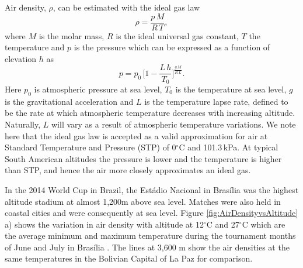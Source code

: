 \documentclass[a4paper]{article}
\begin{document}
Air density, $\rho$, can be estimated with the ideal gas law~\cite{IdealGasLaw}
%
\begin{equation}
\rho = \frac{p\,M}{R\,T},
\end{equation}
%
where $M$ is the molar mass, $R$ is the ideal universal gas constant, $T$ the temperature and $p$ is the pressure which can be expressed as a function of elevation $h$ as
%
\begin{equation}
p = p_{0}\,\Bigg[1 - \frac{L\,h}{T_{0}}\Bigg]^{\frac{g\,M}{R\,L}}.
\end{equation}
%
Here $p_{0}$ is atmospheric pressure at sea level, $T_{0}$ is the temperature at sea level, $g$ is the gravitational acceleration and $L$ is the temperature lapse rate, defined to be the rate at which atmospheric temperature decreases with increasing altitude.  Naturally, $L$ will vary as a result of atmospheric temperature variations.  We note here that the ideal gas law is accepted as a valid approximation for air at Standard Temperature and Pressure (STP) of 0$^{\circ}$C and 101.3\,kPa.  At typical South American altitudes the pressure is lower and the temperature is higher than STP, and hence the air more closely approximates an ideal gas.
%

In the 2014 World Cup in Brazil, the Est\'adio Nacional in Bras\'ilia was the highest altitude stadium at almost 1,200m above sea level.  Matches were also held in coastal cities and were consequently at sea level.  Figure \ref{fig:AirDensityvsAltitude} a) shows the variation in air density with altitude at 12$^{\circ}$C and 27$^{\circ}$C which are the average minimum and maximum temperature during the tournament months of June and July in Bras\'ilia \cite{WeatherWebsite}.  The lines at 3,600 m show the air densities at the same temperatures in the Bolivian Capital of La Paz for comparison.
\end{document}
